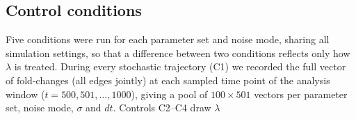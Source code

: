 \documentclass[11pt]{article}
\providecommand{\DIFaddtex}[1]{{\protect\color{red}#1}} %
\providecommand{\DIFdeltex}[1]{} %
\providecommand{\DIFaddbegin}{} %
\providecommand{\DIFaddend}{} %
\providecommand{\DIFdelbegin}{} %
\providecommand{\DIFdelend}{} %
\providecommand{\DIFadd}[1]{\texorpdfstring{\DIFaddtex{#1}}{#1}} %
\providecommand{\DIFdel}[1]{\texorpdfstring{\DIFdeltex{#1}}{}} %
\providecommand{\DIFaddincludegraphics}[2][]{\DIFOincludegraphics[#1]{#2}} %
\providecommand{\DIFdelincludegraphics}[2][]{}
\DeclareRobustCommand{\DIFaddbegin}{\DIFOaddbegin \let\includegraphics\DIFaddincludegraphics} %
\DeclareRobustCommand{\DIFaddend}{\DIFOaddend \let\includegraphics\DIFOincludegraphics} %
\DeclareRobustCommand{\DIFdelbegin}{\DIFOdelbegin \let\includegraphics\DIFdelincludegraphics} %
\DeclareRobustCommand{\DIFdelend}{\DIFOaddend \let\includegraphics\DIFOincludegraphics} %
\begin{document}
\subsection{\DIFdelbegin \DIFdel{Deterministic $\lambda$-resampling comparison}\DIFdelend \DIFaddbegin \DIFadd{Control conditions}\DIFaddend } \DIFdelbegin %

\DIFdel{To test whether a given noise mode's effect on state occupancy could be explained purely by the stationary distribution of }\DIFdelend \DIFaddbegin \label{sec:controls}
\DIFadd{Five conditions were run for each parameter set and noise mode, sharing all simulation settings, so that a difference between two conditions reflects only how }\DIFaddend $\lambda$ \DIFdelbegin \DIFdel{it induces, rather than by any dynamical (non-adiabatic) contribution, we compared stochastic MRT against a deterministic control: for each parameter setand noise level, }\DIFdelend \DIFaddbegin \DIFadd{is treated. During every stochastic trajectory (C1) we recorded the full vector of fold-changes (all edges jointly) at each sampled time point of the analysis window ($t = 500, 501, \dots, 1000$), giving a pool of $100 \times 501$ vectors per parameter set, noise mode, $\sigma$ and $dt$. Controls C2--C4 draw }\DIFaddend $\lambda$ \DIFdelbegin \DIFdel{values were resampled from the empirical stationary distribution generated by that noise mode (via }\texttt{\DIFdel{get\_lambda\_dist}}%
\end{document}
